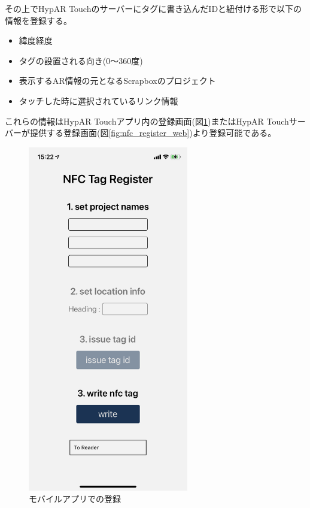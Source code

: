 その上でHypAR Touchのサーバーにタグに書き込んだIDと紐付ける形で以下の情報を登録する。
\begin{itemize}
  \item 緯度経度
  \item タグの設置される向き(0〜360度)
  \item 表示するAR情報の元となるScrapboxのプロジェクト
  \item タッチした時に選択されているリンク情報
\end{itemize}
これらの情報はHypAR Touchアプリ内の登録画面(図\ref{fig:nfc_register_mobile})またはHypAR Touchサーバーが提供する登録画面(図\ref{fig:nfc_register_web})より登録可能である。

\begin{figure}[htbp]
  \begin{minipage}{0.5\hsize}
    \centering
    \includegraphics[width=70mm]{images/nfc_register_mobile.png}
    \caption{モバイルアプリでの登録} \label{fig:nfc_register_mobile}
  \end{minipage}
  \begin{minipage}{0.5\hsize}
    \centering

\end{minipage}
\end{figure}
